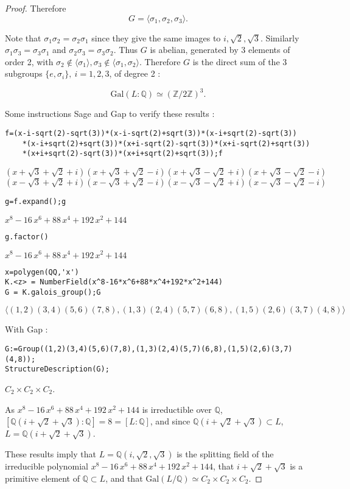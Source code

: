 \documentclass[11pt,a4paper]{article}
\newcommand{\Q}{\mathbb{Q}}
\newcommand{\Z}{\mathbb{Z}}
\newcommand{\Gal}{\mathrm{Gal}}
\begin{document}
\begin{proof}
Therefore $$G = \langle \sigma_1,\sigma_2,\sigma_3\rangle.$$

Note that $\sigma_1 \sigma_2 = \sigma_2 \sigma_1$ since they give the same images to $i,\sqrt{2},\sqrt{3}$. Similarly $\sigma_1 \sigma_3 = \sigma_3 \sigma_1$ and $\sigma_2 \sigma_3 = \sigma_3 \sigma_2$. Thus $G$ is abelian, generated by  3 elements of order 2, with $\sigma_2 \not \in \langle \sigma_1 \rangle, \sigma_3 \not \in \langle \sigma_1,\sigma_2 \rangle$. Therefore $G$ is the direct sum of the 3 subgroups $\{e,\sigma_i\},\ i=1,2,3$, of degree 2 :

$$\Gal(L:\Q) \simeq (\Z/2\Z)^3.$$

Some instructions Sage and Gap to verify these results :
\begin{verbatim}
f=(x-i-sqrt(2)-sqrt(3))*(x-i-sqrt(2)+sqrt(3))*(x-i+sqrt(2)-sqrt(3))
	*(x-i+sqrt(2)+sqrt(3))*(x+i-sqrt(2)-sqrt(3))*(x+i-sqrt(2)+sqrt(3))
	*(x+i+sqrt(2)-sqrt(3))*(x+i+sqrt(2)+sqrt(3));f
\end{verbatim}
${\left(x + \sqrt{3} + \sqrt{2} + i\right)} {\left(x + \sqrt{3} +\sqrt{2} - i\right)} {\left(x + \sqrt{3} - \sqrt{2} + i\right)} {\left(x+ \sqrt{3} - \sqrt{2} - i\right)}$\\
$ {\left(x - \sqrt{3} + \sqrt{2} +i\right)} {\left(x - \sqrt{3} + \sqrt{2} - i\right)} {\left(x - \sqrt{3}- \sqrt{2} + i\right)} {\left(x - \sqrt{3} - \sqrt{2} - i\right)}$

\begin{verbatim}
g=f.expand();g
\end{verbatim}
$x^{8} - 16 \, x^{6} + 88 \, x^{4} + 192 \, x^{2} + 144$
\begin{verbatim}
g.factor()
\end{verbatim}
$x^{8} - 16 \, x^{6} + 88 \, x^{4} + 192 \, x^{2} + 144$

\begin{verbatim}
x=polygen(QQ,'x')
K.<z> = NumberField(x^8-16*x^6+88*x^4+192*x^2+144)
G = K.galois_group();G
\end{verbatim}
$\langle (1,2)(3,4)(5,6)(7,8), (1,3)(2,4)(5,7)(6,8), (1,5)(2,6)(3,7)(4,8)
\rangle$

\bigskip

With Gap : 
\begin{verbatim}
G:=Group((1,2)(3,4)(5,6)(7,8),(1,3)(2,4)(5,7)(6,8),(1,5)(2,6)(3,7)(4,8));
StructureDescription(G);
\end{verbatim}
$C_2\times C_2\times C_2$.

\bigskip
As $x^{8} - 16 \, x^{6} + 88 \, x^{4} + 192 \, x^{2} + 144$ is irreductible over $\Q$, $[\Q(i+\sqrt{2}+\sqrt{3}) : \Q] = 8 = [L:\Q]$, and since $\Q(i+\sqrt{2}+\sqrt{3})  \subset L$, $L = \Q(i+\sqrt{2}+\sqrt{3}) $.

These results imply that $L= \Q(i,\sqrt{2},\sqrt{3})$ is the splitting field of the irreducible polynomial $x^{8} - 16 \, x^{6} + 88 \, x^{4} + 192 \, x^{2} + 144$, that $i+\sqrt{2}+\sqrt{3}$ is a primitive element of $\Q \subset L$, and that $\Gal(L/\Q) \simeq C_2\times C_2\times C_2.$
\end{proof}
\end{document}
